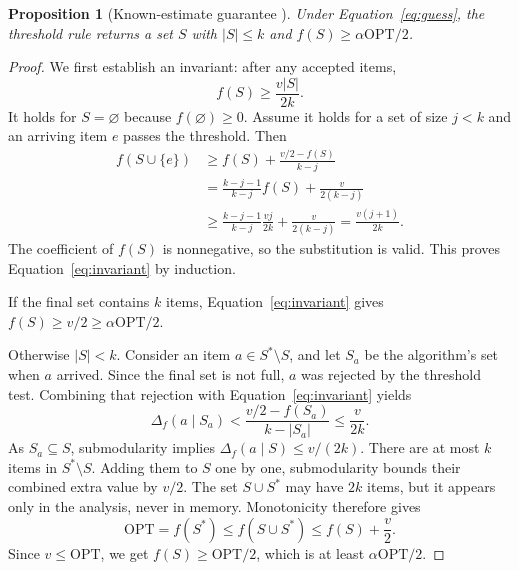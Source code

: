 \documentclass[10pt]{article}
\newtheorem{proposition}{Proposition}
\newcommand{\OPT}{\mathrm{OPT}}
\newcommand{\marg}[2]{\Delta_f(#1\mid #2)}
\begin{document}
\begin{proposition}[Known-estimate guarantee \cite{badanidiyuru2014streaming}]
Under Equation~\eqref{eq:guess}, the threshold rule returns a set $S$ with $|S|\leq k$ and $f(S)\geq\alpha\OPT/2$.
\end{proposition}

\begin{proof}
We first establish an invariant: after any accepted items,
\begin{equation}
  f(S)\geq\frac{v|S|}{2k}.
  \label{eq:invariant}
\end{equation}
It holds for $S=\varnothing$ because $f(\varnothing)\geq0$. Assume it holds for a set of size $j<k$ and an arriving item $e$ passes the threshold. Then
\begin{align*}
f(S\cup\{e\})
&\geq f(S)+\frac{v/2-f(S)}{k-j}\\
&=\frac{k-j-1}{k-j}f(S)+\frac{v}{2(k-j)}\\
&\geq\frac{k-j-1}{k-j}\frac{vj}{2k}+\frac{v}{2(k-j)}
=\frac{v(j+1)}{2k}.
\end{align*}
The coefficient of $f(S)$ is nonnegative, so the substitution is valid. This proves Equation~\eqref{eq:invariant} by induction.

If the final set contains $k$ items, Equation~\eqref{eq:invariant} gives $f(S)\geq v/2\geq\alpha\OPT/2$.

Otherwise $|S|<k$. Consider an item $a\in S^*\setminus S$, and let $S_a$ be the algorithm's set when $a$ arrived. Since the final set is not full, $a$ was rejected by the threshold test. Combining that rejection with Equation~\eqref{eq:invariant} yields
\begin{equation*}
  \marg{a}{S_a}
  <\frac{v/2-f(S_a)}{k-|S_a|}
  \leq\frac{v}{2k}.
\end{equation*}
As $S_a\subseteq S$, submodularity implies $\marg{a}{S}\leq v/(2k)$. There are at most $k$ items in $S^*\setminus S$. Adding them to $S$ one by one, submodularity bounds their combined extra value by $v/2$. The set $S\cup S^*$ may have $2k$ items, but it appears only in the analysis, never in memory. Monotonicity therefore gives
\begin{equation*}
  \OPT=f(S^*)\leq f(S\cup S^*)\leq f(S)+\frac{v}{2}.
\end{equation*}
Since $v\leq\OPT$, we get $f(S)\geq\OPT/2$, which is at least $\alpha\OPT/2$.
\end{proof}
\end{document}
